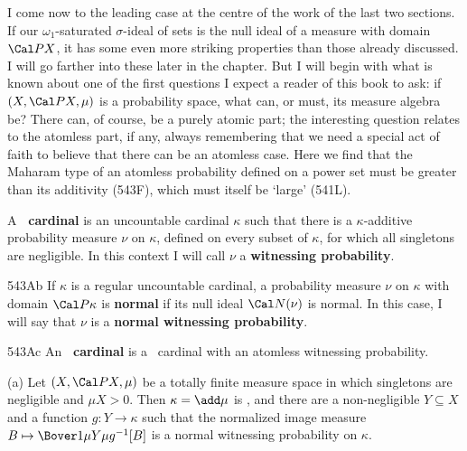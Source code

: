 
\def\chaptername{Real-valued-measurable cardinals}
\def\sectionname{The Gitik-Shelah theorem}


I come now to the leading case at the centre of the work of the last two
sections.   If our $\omega_1$-saturated $\sigma$-ideal of sets is the
null ideal of a measure with domain $\Cal PX$, it has some even more
striking properties than those already discussed.   I will go farther into
these later in the chapter.   But I will begin with what is known about one
of the first questions I expect a reader of this book to ask:   if
$(X,\Cal PX,\mu)$ is a probability space, what can, or must, its measure
algebra be?   There can, of course, be a purely atomic part;  the
interesting question relates to the atomless part, if any, always
remembering that we need a special act of faith to believe that there can
be an atomless case.   Here we find that the Maharam type of an atomless
probability defined on a power set must be greater than its additivity
(543F), which must itself be `large' (541L).

 A {\bf\rvm\ cardinal} is an uncountable
cardinal $\kappa$ such that there is a $\kappa$-additive probability
measure $\nu$ on $\kappa$, defined on every subset of $\kappa$, for which
all singletons are negligible.   In this context I will call $\nu$ a
{\bf witnessing probability}.

\spheader 543Ab If $\kappa$ is a regular uncountable cardinal, a
probability measure $\nu$ on $\kappa$ with domain $\Cal P\kappa$ is
{\bf normal} if its null ideal $\Cal N(\nu)$ is normal.   In this
case, I will say that $\nu$ is a {\bf normal
witnessing probability}.

\spheader 543Ac An {\bf\am\ cardinal} is a \rvm\ cardinal with an
atomless witnessing probability.

 (a) Let $(X,\Cal PX,\mu)$ be a totally finite
measure space in which singletons are negligible and $\mu X>0$.
Then $\kappa=\add\mu$ is \rvm,
and there are a non-negligible $Y\subseteq X$ and a function
$g:Y\to\kappa$ such that the normalized image measure
$B\mapsto\Bover1{\mu Y}\mu g^{-1}[B]$ is a normal witnessing probability
on $\kappa$.

